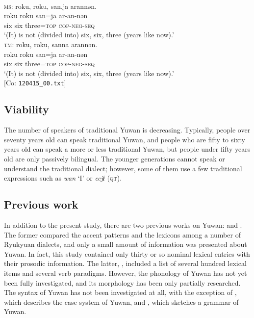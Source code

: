 \ea\label{ex:key:1}\\
\textsc{ms}: \glll {\textbar}roku, roku, san{\textbar}.ja arannən.\\
 roku roku san=ja ar-an-nən\\
 six six three=\textsc{top} \textsc{cop}-\textsc{neg}-\textsc{seq}\\
\glt{} ‘(It) is not (divided into) six, six, three (years like now).’\\
\textsc{tm}: \glll {\textbar}roku, roku, san{\textbar}na arannən.\\
 roku roku san=ja ar-an-nən\\
 six six three=\textsc{top} \textsc{cop}-\textsc{neg}-\textsc{seq}\\
\glt{} ‘(It) is not (divided into) six, six, three (years like now).’\\ [Co: \texttt{120415\_00.txt}]
\z

\subsection{Viability}
\hypertarget{RefHeadingToc395696956}{}
The number of speakers of traditional Yuwan is decreasing. Typically, people over seventy years old can speak traditional Yuwan, and people who are fifty to sixty years old can speak a more or less traditional Yuwan, but people under fifty years old are only passively bilingual. The younger generations cannot speak or understand the traditional dialect; however, some of them use a few traditional expressions such as \textit{wan} ‘I’ or \textit{ccjɨ} (\textsc{qt}).

\subsection{Previous work}
\hypertarget{RefHeadingToc395696957}{}
In addition to the present study, there are two previous works on Yuwan: \citet{HirayamaEtAl1966} and \citet{UchimaEtAl1976}. The former compared the accent patterns and the lexicons among a number of Ryukyuan dialects, and only a small amount of information was presented about Yuwan. In fact, this study contained only thirty or so nominal lexical entries with their prosodic information. The latter, \citet{UchimaEtAl1976}, included a list of several hundred lexical items and several verb paradigms. However, the phonology of Yuwan has not yet been fully investigated, and its morphology has been only partially researched. The syntax of Yuwan has not been investigated at all, with the exception of \citet{Niinaga2008}, which describes the case system of Yuwan, and \citet{Niinaga2010}, which sketches a grammar of Yuwan.

